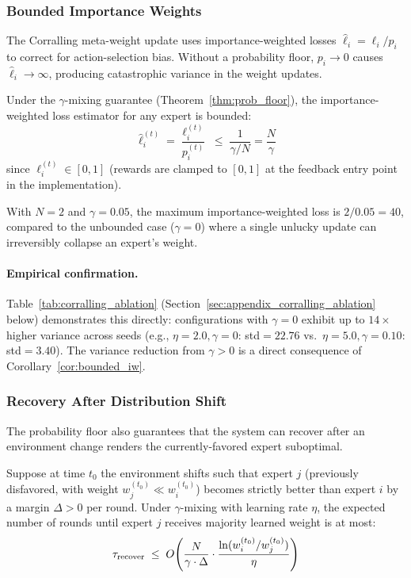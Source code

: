 \subsubsection{Bounded Importance Weights}

The Corralling meta-weight update uses importance-weighted losses
$\hat{\ell}_i = \ell_i / p_i$ to correct for action-selection bias.  Without a
probability floor, $p_i \to 0$ causes $\hat{\ell}_i \to \infty$, producing
catastrophic variance in the weight updates.

\begin{corollary}
\label{cor:bounded_iw}
Under the $\gamma$-mixing guarantee (Theorem~\ref{thm:prob_floor}), the
importance-weighted loss estimator for any expert is bounded:
\begin{equation}
\hat{\ell}_i^{(t)} = \frac{\ell_i^{(t)}}{p_i^{(t)}}
\;\leq\; \frac{1}{\gamma / N}
= \frac{N}{\gamma}
\label{eq:iw_bound}
\end{equation}
since $\ell_i^{(t)} \in [0, 1]$ (rewards are clamped to $[0, 1]$ at the
feedback entry point in the implementation).
\end{corollary}

With $N = 2$ and $\gamma = 0.05$, the maximum importance-weighted loss is
$2 / 0.05 = 40$, compared to the unbounded case ($\gamma = 0$) where a single
unlucky update can irreversibly collapse an expert's weight.

\paragraph{Empirical confirmation.}
Table~\ref{tab:corralling_ablation} (Section~\ref{sec:appendix_corralling_ablation}
below) demonstrates this directly: configurations with $\gamma = 0$ exhibit up
to $14\times$ higher variance across seeds (e.g., $\eta=2.0, \gamma=0$:
std$=22.76$ vs.\ $\eta=5.0, \gamma=0.10$: std$=3.40$).  The variance
reduction from $\gamma > 0$ is a direct consequence of
Corollary~\ref{cor:bounded_iw}.

\subsubsection{Recovery After Distribution Shift}

The probability floor also guarantees that the system can recover after
an environment change renders the currently-favored expert suboptimal.

\begin{theorem}
\label{thm:recovery}
Suppose at time $t_0$ the environment shifts such that expert $j$ (previously
disfavored, with weight $w_j^{(t_0)} \ll w_i^{(t_0)}$) becomes strictly
better than expert $i$ by a margin $\Delta > 0$ per round.  Under $\gamma$-mixing
with learning rate $\eta$, the expected number of rounds until expert $j$
receives majority learned weight is at most:
\begin{equation}
\tau_{\textnormal{recover}}
\;\leq\; O\!\left(
    \frac{N}{\gamma \cdot \Delta} \cdot
    \frac{\ln(w_i^{(t_0)} / w_j^{(t_0)})}{\eta}
\right)
\label{eq:recovery_bound}
\end{equation}
\end{theorem}

